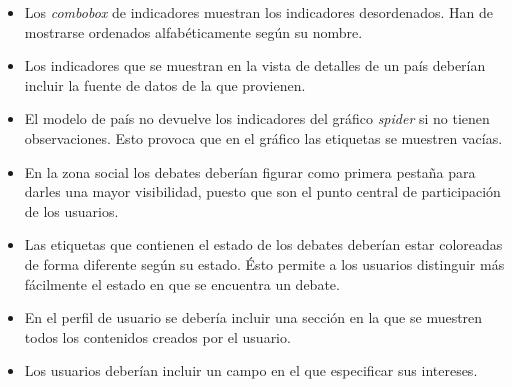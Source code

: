 \begin{itemize}
	\item Los \textit{combobox} de indicadores muestran los indicadores desordenados.  Han de mostrarse ordenados alfabéticamente según su nombre.
	\item Los indicadores que se muestran en la vista de detalles de un país deberían incluir la fuente de datos de la que provienen.
	\item El modelo de país no devuelve los indicadores del gráfico \textit{spider} si no tienen observaciones.  Esto provoca que en el gráfico las etiquetas se muestren vacías.
	\item En la zona social los debates deberían figurar como primera pestaña para darles una mayor visibilidad, puesto que son el punto central de participación de los usuarios.
	\item Las etiquetas que contienen el estado de los debates deberían estar coloreadas de forma diferente según su estado.  Ésto permite a los usuarios distinguir más fácilmente el estado en que se encuentra un debate.
	\item En el perfil de usuario se debería incluir una sección en la que se muestren todos los contenidos creados por el usuario.
	\item Los usuarios deberían incluir un campo en el que especificar sus intereses.
\end{itemize}
